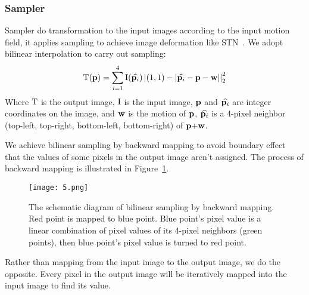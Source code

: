 \documentclass{article}
\begin{document}
\subsubsection{Sampler}
Sampler do transformation to the input images according to the input motion field, it applies sampling to achieve image deformation like STN~\cite{jaderberg2015spatial}.
We adopt bilinear interpolation to carry out sampling:
\begin{equation}\label{6}
{\rm{T}}({\bf{p}}) = \sum\limits_{i = 1}^4 {{\rm{I}}(\widehat {{{\bf{p}}_i}})\left| {(1,1) - \left| {\widehat {{{\bf{p}}_i}} - {\bf{p}} - {\bf{w}}} \right|} \right|_2^2}
\end{equation}
Where ${\rm T}$ is the output image, ${\rm I}$ is the input image, ${\bf{p}}$ and ${\widehat {{{\bf{p}}_i}}}$ are integer coordinates on the image, and ${\bf{w}}$ is the motion of ${\bf{p}}$, ${\widehat {{{\bf{p}}_i}}}$ is a 4-pixel neighbor (top-left, top-right, bottom-left, bottom-right) of ${{\bf{p}}{\rm{ + }}{\bf{w}}}$.

We achieve bilinear sampling by backward mapping to avoid boundary effect~\cite{lin2017inverse} that the values of some pixels in the output image aren't assigned.
The process of backward mapping is illustrated in Figure~\ref{fig:6}.
\begin{figure}[t]
    \centering
    \texttt{[image: 5.png]}
    \caption{\label{fig:6}The schematic diagram of bilinear sampling by backward mapping. Red point is mapped to blue point. Blue point's pixel value is a linear combination of pixel values of its 4-pixel neighbors (green points), then blue point's pixel value is turned to red point.}
\end{figure}
Rather than mapping from the input image to the output image, we do the opposite.
Every pixel in the output image will be iteratively mapped into the input image to find its value.
\end{document}
